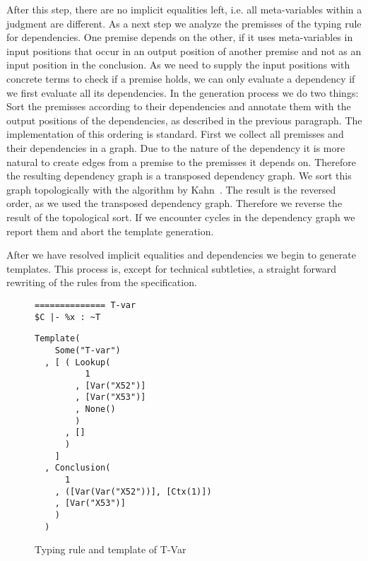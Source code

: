 
After this step, there are no implicit equalities left, i.e. all
meta-variables within a judgment are different. As a next step we
analyze the premisses of the typing rule for dependencies. One premise
depends on the other, if it uses meta-variables in input positions
that occur in an output position of another premise and not as an
input position in the conclusion. As we need to supply the input
positions with concrete terms to check if a premise holds, we can only
evaluate a dependency if we first evaluate all its dependencies. In
the generation process we do two things: Sort the premisses according
to their dependencies and annotate them with the output positions of
the dependencies, as described in the previous paragraph. The
implementation of this ordering is standard. First we collect all
premisses and their dependencies in a graph. Due to the nature of the
dependency it is more natural to create edges from a premise to the
premisses it depends on. Therefore the resulting dependency graph is a
transposed dependency graph. We sort this graph topologically with the
algorithm by Kahn~\cite{Kahn:1962:TSL:368996.369025}. The result is
the reversed order, as we used the transposed dependency
graph. Therefore we reverse the result of the topological sort. If we
encounter cycles in the dependency graph we report them and abort the
template generation.

After we have resolved implicit equalities and dependencies we begin
to generate templates. This process is, except for technical
subtleties, a straight forward rewriting of the rules from the
specification. 

\begin{figure}
  \centering
  \begin{minipage}{.35\linewidth}
\begin{lstlisting}[language=sltc]
%x : ~T in $C
============== T-var
$C |- %x : ~T
\end{lstlisting}
  \end{minipage}
  \begin{minipage}{.55\linewidth}
\begin{lstlisting}[language=sltc]
Template(
    Some("T-var")
  , [ ( Lookup(
          1
        , [Var("X52")]
        , [Var("X53")]
        , None()
        )
      , []
      )
    ]
  , Conclusion(
      1
    , ([Var(Var("X52"))], [Ctx(1)])
    , [Var("X53")]
    )
  )
\end{lstlisting}
  \end{minipage}
  \caption{Typing rule and template of T-Var}
  \label{fig:template-example}
\end{figure}
